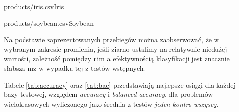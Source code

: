 \documentclass[]{article}
\begin{document}
\begin{table}[!ht]
    \parbox{.45\linewidth}{
	    \begin{ride}{products/iris.csv}{Iris}\end{ride}
	}
	\hfill
    \parbox{.45\linewidth}{
	    \begin{ride}{products/soybean.csv}{Soybean}\end{ride}
	}
\end{table}

\FloatBarrier

Na podstawie zaprezentowanych przebiegów można zaobserwować, że w wybranym zakresie promienia, jeśli ziarno ustalimy na relatywnie niedużej wartości, zależność pomiędzy nim a efektywnością klasyfikacji jest znacznie słabsza niż w wypadku tej z testów wstępnych.

Tabele \ref{tab:accuracy} oraz \ref{tab:bac} przedstawiają najlepsze osiągi dla każdej bazy testowej, względem \emph{accuracy} i \emph{balanced accuracy}, dla problemów wieloklasowych wyliczonego jako średnia z testów \emph{jeden kontra wszyscy}. 
\end{document}
